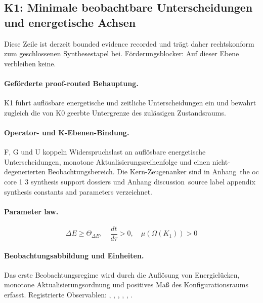 \subsection{K1: Minimale beobachtbare Unterscheidungen und energetische Achsen}
\label{sec:oc-core-1-3-synthesis-k1}
Diese Zeile ist derzeit bounded evidence recorded und trägt daher rechtskonform zum geschlossenen Synthesestapel bei.
Förderungsblocker: Auf dieser Ebene verbleiben keine.

\paragraph{Geförderte proof-routed Behauptung.}
K1 führt auflösbare energetische und zeitliche Unterscheidungen ein und bewahrt zugleich die von K0 geerbte Untergrenze des zulässigen Zustandsraums.

\paragraph{Operator- und K-Ebenen-Bindung.}
F, G und U koppeln Widerspruchslast an auflösbare energetische Unterscheidungen, monotone Aktualisierungsreihenfolge und einen nicht-degenerierten Beobachtungsbereich.
Die Kern-Zeugenanker sind in Anhang~the oc core 1 3 synthesis support dossiers und Anhang discussion~source label appendix synthesis constants and parameters verzeichnet.

\paragraph{Parameter law.}
\[
\Delta E \geq \Theta_{\Delta E},\quad \frac{dt}{d\tau} > 0,\quad \mu(\Omega(K_1)) > 0
\]

\paragraph{Beobachtungsabbildung und Einheiten.}
Das erste Beobachtungsregime wird durch die Auflösung von Energielücken, monotone Aktualisierungsordnung und positives Maß des Konfigurationsraums erfasst.
Registrierte Observablen: , \allowbreak {}, \allowbreak {}, \allowbreak {}, \allowbreak {}, \allowbreak {}.

